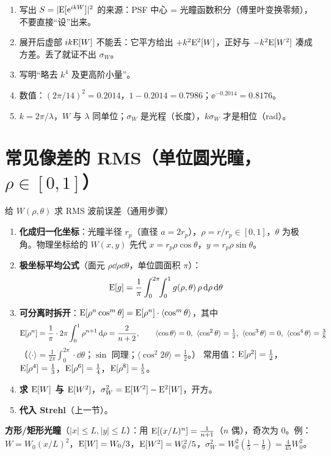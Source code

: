 \begin{warn}
\begin{enumerate}
\item 写出 $S=|\mathrm{E}[\mathrm{e}^{ikW}]|^2$ 的来源：PSF 中心 = 光瞳函数积分（傅里叶变换零频），不要直接“设”出来。
\item 展开后虚部 $ik\mathrm{E}[W]$ 不能丢：它平方给出 $+k^2\mathrm{E}^2[W]$，正好与 $-k^2\mathrm{E}[W^2]$ 凑成方差。丢了就证不出 $\sigma_W$。
\item 写明“略去 $k^4$ 及更高阶小量”。
\item 数值：$(2\pi/14)^2=0.2014$，$1-0.2014=0.7986$；$\ee^{-0.2014}=0.8176$。
\item $k=2\pi/\lambda$，$W$ 与 $\lambda$ 同单位；$\sigma_W$ 是光程（长度），$k\sigma_W$ 才是相位（rad）。
\end{enumerate}
\end{warn}

\section{常见像差的 RMS（单位圆光瞳，$\rho\in[0,1]$）}\label{sec:aberrms}

\begin{recipe}{给 $W(\rho,\theta)$ 求 RMS 波前误差（通用步骤）}\label{rc:rms}
\begin{enumerate}
\item \textbf{化成归一化坐标}：光瞳半径 $r_p$（直径 $a=2r_p$），$\rho=r/r_p\in[0,1]$，$\theta$ 为极角。物理坐标给的 $W(x,y)$ 先代 $x=r_p\rho\cos\theta$，$y=r_p\rho\sin\theta$。
\item \textbf{极坐标平均公式}（面元 $\rho\dd\rho\dd\theta$，单位圆面积 $\pi$）：
\[
\mathrm{E}[g]=\frac1\pi\int_0^{2\pi}\!\!\int_0^1 g(\rho,\theta)\,\rho\,\mathrm{d}\rho\,\mathrm{d}\theta
\]
\item \textbf{可分离时拆开}：$\mathrm{E}[\rho^n\cos^m\theta]=\mathrm{E}[\rho^n]\cdot\langle\cos^m\theta\rangle$，其中
\[
\E[\rho^n]=\frac1\pi\cdot2\pi\int_0^1\rho^{n+1}\dd\rho=\frac{2}{n+2},\qquad
\langle\cos\theta\rangle=0,\ \langle\cos^2\theta\rangle=\tfrac12,\ \langle\cos^3\theta\rangle=0,\ \langle\cos^4\theta\rangle=\tfrac38
\]
（$\langle\cdot\rangle=\frac1{2\pi}\int_0^{2\pi}\cdot\dd\theta$；$\sin$ 同理；$\langle\cos^2 2\theta\rangle=\frac12$。）
常用值：$\mathrm{E}[\rho^2]=\frac12$，$\mathrm{E}[\rho^4]=\frac13$，$\mathrm{E}[\rho^6]=\frac14$，$\mathrm{E}[\rho^8]=\frac15$。
\item \textbf{求 $\mathrm{E}[W]$ 与 $\mathrm{E}[W^2]$}，$\sigma_W^2=\mathrm{E}[W^2]-\mathrm{E}^2[W]$，开方。
\item \textbf{代入 Strehl}（上一节）。
\end{enumerate}
\textbf{方形/矩形光瞳}（$|x|\le L,|y|\le L$）：用 $\mathrm{E}[(x/L)^n]=\frac{1}{n+1}$（$n$ 偶），奇次为 0。例：$W=W_0(x/L)^2$，$\mathrm{E}[W]=W_0/3$，$\mathrm{E}[W^2]=W_0^2/5$，$\sigma_W^2=W_0^2(\frac15-\frac19)=\frac{4}{45}W_0^2$。
\end{recipe}

